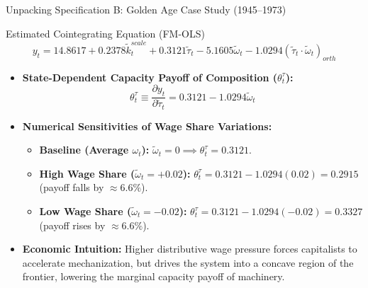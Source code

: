 \documentclass[10pt]{beamer}
\begin{document}
\begin{frame}{Unpacking Specification B: Golden Age Case Study (1945--1973)}
  \begin{block}{Estimated Cointegrating Equation (FM-OLS)}
    $$y_t = 14.8617 + 0.2378 \tilde{k}^{scale}_t + 0.3121 \tilde{\tau}_t - 5.1605 \tilde{\omega}_t - 1.0294 (\tilde{\tau}_t \cdot \tilde{\omega}_t)_{orth}$$
  \end{block}
  \begin{itemize}
    \item \textbf{State-Dependent Capacity Payoff of Composition ($\theta^{\tau}_t$):}
      $$\theta^{\tau}_t \equiv \frac{\partial y_t}{\partial \tilde{\tau}_t} = 0.3121 - 1.0294 \tilde{\omega}_t$$
    \item \textbf{Numerical Sensitivities of Wage Share Variations:}
      \begin{itemize}
        \item \textbf{Baseline (Average $\omega_t$):} $\tilde{\omega}_t = 0 \implies \theta^{\tau}_t = \mathbf{0.3121}$.
        \item \textbf{High Wage Share ($\tilde{\omega}_t = +0.02$):} $\theta^{\tau}_t = 0.3121 - 1.0294(0.02) = \mathbf{0.2915}$ (payoff falls by $\approx 6.6\%$).
        \item \textbf{Low Wage Share ($\tilde{\omega}_t = -0.02$):} $\theta^{\tau}_t = 0.3121 - 1.0294(-0.02) = \mathbf{0.3327}$ (payoff rises by $\approx 6.6\%$).
      \end{itemize}
    \item \textbf{Economic Intuition:} Higher distributive wage pressure forces capitalists to accelerate mechanization, but drives the system into a concave region of the frontier, lowering the marginal capacity payoff of machinery.
  \end{itemize}
\end{frame}
\end{document}

